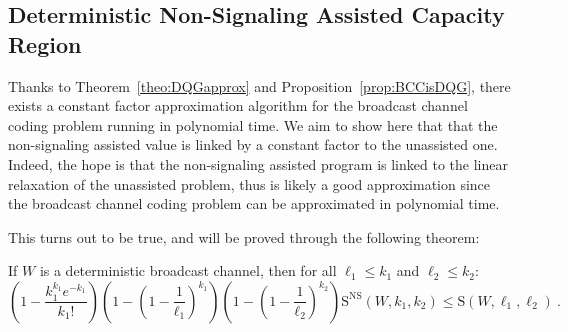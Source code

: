\subsection{Deterministic Non-Signaling Assisted Capacity Region}
Thanks to Theorem~\ref{theo:DQGapprox} and Proposition~\ref{prop:BCCisDQG}, there exists a constant factor approximation algorithm for the broadcast channel coding problem running in polynomial time. We aim to show here that that the non-signaling assisted value is linked by a constant factor to the unassisted one. Indeed, the hope is that the non-signaling assisted program is linked to the linear relaxation of the unassisted problem, thus is likely a good approximation since the broadcast channel coding problem can be approximated in polynomial time.

This turns out to be true, and will be proved through the following theorem:

\begin{theo}
  \label{theo:NSdet}
  If $W$ is a deterministic broadcast channel, then for all $\ell_1 \leq k_1$ and $\ell_2 \leq k_2$:
  \[ \left(1 - \frac{k_1^{k_1}e^{-k_1}}{k_1!}\right)\left(1-\left(1-\frac{1}{\ell_1}\right)^{k_1}\right)\left(1-\left(1-\frac{1}{\ell_2}\right)^{k_2}\right)\mathrm{S}^{\mathrm{NS}}(W,k_1,k_2) \leq \mathrm{S}(W,\ell_1,\ell_2)\ . \]
  
  
\end{theo}

